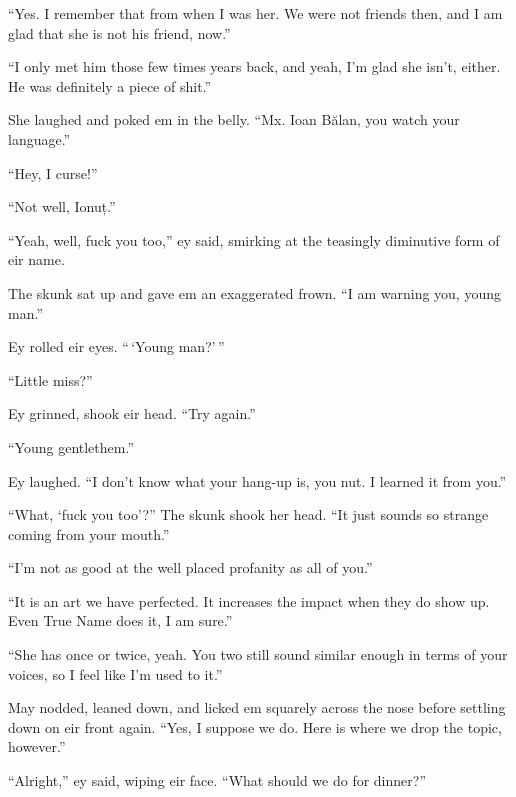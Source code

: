 ``Yes. I remember that from when I was her. We were not friends then, and I am glad that she is not his friend, now.''

``I only met him those few times years back, and yeah, I'm glad she isn't, either. He was definitely a piece of shit.''

She laughed and poked em in the belly. ``Mx. Ioan Bălan, you watch your language.''

``Hey, I curse!''

``Not well, Ionuț.''

``Yeah, well, fuck you too,'' ey said, smirking at the teasingly diminutive form of eir name.

The skunk sat up and gave em an exaggerated frown. ``I am warning you, young man.''

Ey rolled eir eyes. ``\,`Young man?'\,''

``Little miss?''

Ey grinned, shook eir head. ``Try again.''

``Young gentlethem.''

Ey laughed. ``I don't know what your hang-up is, you nut. I learned it from you.''

``What, `fuck you too'?'' The skunk shook her head. ``It just sounds so strange coming from your mouth.''

``I'm not as good at the well placed profanity as all of you.''

``It is an art we have perfected. It increases the impact when they do show up. Even True Name does it, I am sure.''

``She has once or twice, yeah. You two still sound similar enough in terms of your voices, so I feel like I'm used to it.''

May nodded, leaned down, and licked em squarely across the nose before settling down on eir front again. ``Yes, I suppose we do. Here is where we drop the topic, however.''

``Alright,'' ey said, wiping eir face. ``What should we do for dinner?''
